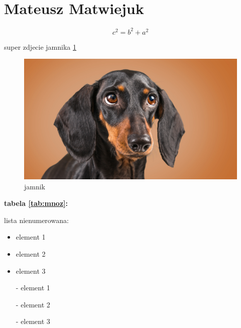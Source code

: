 \section{Mateusz Matwiejuk}


\[c^2 = b^2 + a^2\]


super zdjecie jamnika \ref{fig:jamnik}
\begin{figure}[htbp]

    \centering
    \includegraphics[scale=0.4]{pictures/jamnik.png}
    
    \caption{jamnik}
    \label{fig:jamnik}
\end{figure}

\vspace{2 cm}

\textbf{tabela \ref{tab:mnoz}:}


\vspace{2 cm}

lista nienumerowana:

\begin{itemize}
  \item element 1
  \item element 2
  \item element 3
\end{itemize}

\begin{itemize}
  \item[-] element 1
  \item[-] element 2
  \item[-] element 3
\end{itemize}


